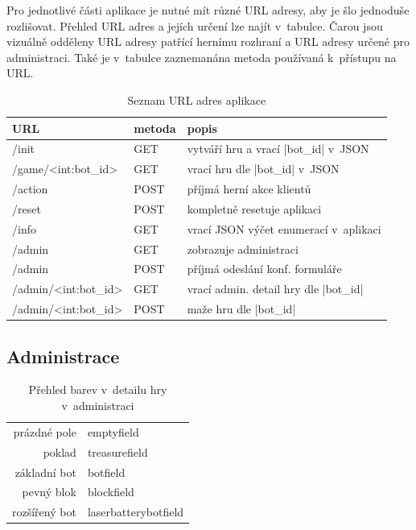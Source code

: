 Pro jednotlivé části aplikace je nutné mít různé URL adresy, aby je šlo jednoduše rozlišovat. Přehled URL adres a jejích určení lze najít v~tabulce. Čarou jsou vizuálně odděleny URL adresy patřící hernímu rozhraní a URL adresy určené pro administraci. Také je v~tabulce zaznemanána metoda používaná k~přístupu na URL.
{
\captionsetup{belowskip=-5pt,aboveskip=0pt}
\begin{table}[H]
	\caption{Seznam URL adres aplikace}
	\label{table:urls}
	\centering
	\begin{tabular}{ B | B | p{37.5ex} }
		URL & metoda & popis \\
		\hline
		/init & GET & vytváří hru a vrací \ic|bot_id| v~JSON \\
		/game/<int:bot_id> & GET & vrací hru dle \ic|bot_id| v~JSON \\
		/action & POST & příjmá herní akce klientů \\
		/reset & POST & kompletně resetuje aplikaci \\
		/info & GET & vrací JSON výčet enumerací v~aplikaci \\
		\hline
		/admin & GET & zobrazuje administraci \\
		/admin & POST & příjmá odeslání konf. formuláře \\
		/admin/<int:bot_id> & GET & vrací admin. detail hry dle \ic|bot_id| \\
		/admin/<int:bot_id> & POST & maže hru dle \ic|bot_id| \\
	\end{tabular}
\end{table}
}

\subsection{Administrace}

\begin{table}
	\caption{Přehled barev v~detailu hry v~administraci}
	\label{table:game-detail-colors}
	\newcommand{\colpic}[1]{\tikz \draw[#1,fill=#1,draw](0,0)circle(7.5pt);}
	\vspace{-10pt}
	\begin{flushright}
		\begin{tabular}{ r | M }
			prázdné pole & emptyfield \\
			poklad & treasurefield \\
			základní bot & botfield \\
			pevný blok & blockfield \\
			rozšířený bot & laserbatterybotfield \\
		\end{tabular}
	\end{flushright}
\end{table}

